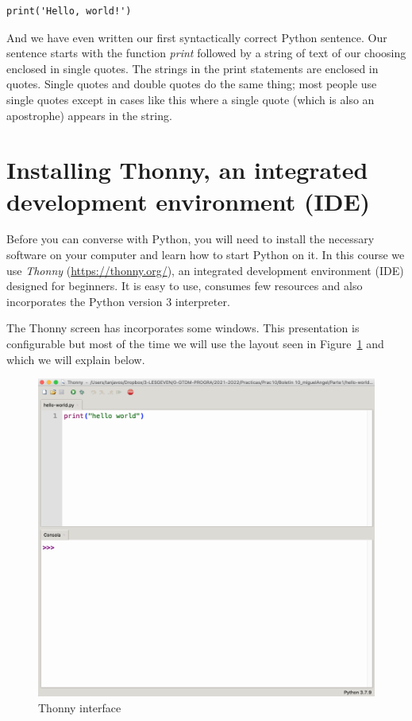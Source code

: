 \begin{Verbatim}[frame=single]
    print('Hello, world!')
\end{Verbatim}

And we have even written our first syntactically correct Python sentence. Our sentence starts with the function \emph{print} followed by a string of text of our choosing enclosed in single quotes. The strings in the print statements are enclosed in quotes. Single quotes and double quotes do the same thing; most people use single quotes except in cases like this where a single quote (which is also an apostrophe) appears in the string.

\section{Installing Thonny, an integrated development environment (IDE)}

Before you can converse with Python, you will need to install the necessary software on your computer and learn how to start Python on it. In this course we use {\em Thonny} (\url{https://thonny.org/}), an integrated development environment (IDE) designed for beginners. It is easy to use, consumes few resources and also incorporates the Python version 3 interpreter.


The Thonny screen has incorporates some windows. This presentation is configurable but most of the time we will use the layout seen in Figure~\ref{fig:Thonny} and which we will explain below.

\begin{figure}
	\centering
	\includegraphics[width=.85\textwidth]{images/Thonny.png}
	\caption{Thonny interface}
	\label{fig:Thonny}
\end{figure}

